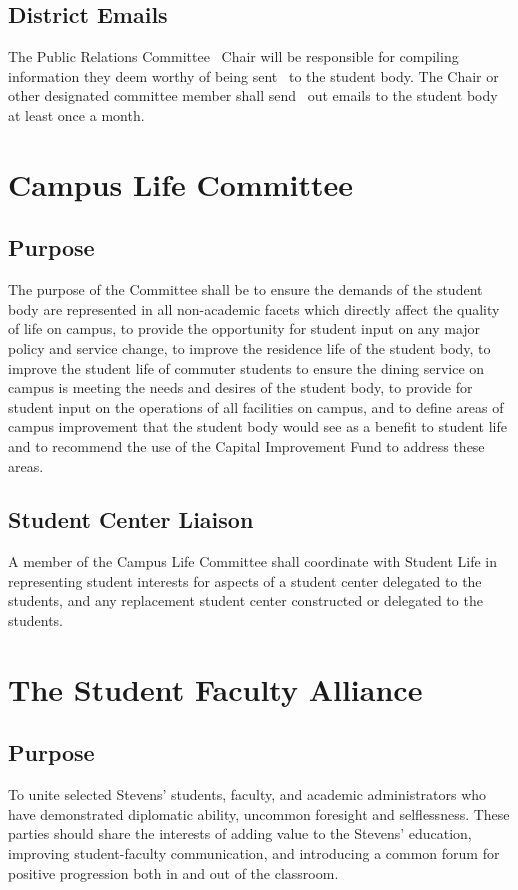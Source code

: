 \documentclass[12pt]{scrreprt}
\begin{document}
\subsection{District Emails}
The Public Relations Committee  Chair will be responsible for compiling information they deem worthy of being sent  to the student body. The Chair or other designated committee member shall send  out emails to the student body at least once a month.  


\section{Campus Life Committee}

\subsection{Purpose}
The purpose of the Committee shall be to ensure the demands of the student 
body are represented in all non-academic facets which directly affect the 
quality of life on campus, to provide the opportunity for student input on any 
major policy and service change, to improve the residence life of the student 
body, to improve the student life of commuter students to ensure the dining 
service on campus is meeting the needs and desires of the student body, to 
provide for student input on the operations of all facilities on campus, and 
to define areas of campus improvement that the student body would see as a 
benefit to student life and to recommend the use of the Capital Improvement 
Fund to address these areas.

\subsection{Student Center Liaison}
A member of the Campus Life Committee shall coordinate with Student Life in 
representing student interests for aspects of a student center delegated to 
the students, and any replacement student center constructed or delegated to 
the students.

\section{The Student Faculty Alliance}

\subsection{Purpose}
To unite selected Stevens’ students, faculty, and academic administrators who have
demonstrated diplomatic ability, uncommon foresight and selflessness. These parties
should share the interests of adding value to the Stevens’ education, improving student-faculty
communication, and introducing a common forum for positive progression both
in and out of the classroom.
\end{document}

